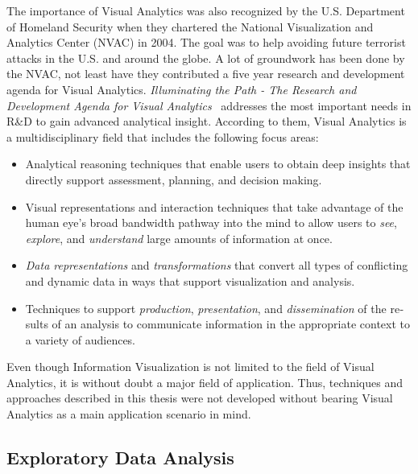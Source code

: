 \begin{english}
The importance of Visual Analytics was also recognized by the U.S. Department of Homeland Security when they chartered the National Visualization and Analytics Center (NVAC) in 2004. The goal was to help avoiding future terrorist attacks in the U.S. and around the globe. A lot of groundwork has been done by the NVAC, not least have they contributed a five year research and development agenda for Visual Analytics. \emph{Illuminating the Path - The Research and Development Agenda for Visual Analytics}~\cite{IlluminatingThePath05} addresses the most important needs in R\&D to gain advanced analytical insight. According to them, Visual Analytics is a multidisciplinary field that includes the following focus areas:

\begin{itemize}
\item Analytical reasoning techniques that enable users to obtain deep insights that directly support assessment, planning, and decision making.
\item Visual representations and interaction techniques that take advantage of the human eye's broad bandwidth pathway into the mind to allow users to \emph{see}, \emph{explore}, and \emph{understand} large amounts of information at once.
\item \emph{Data representations} and \emph{transformations} that convert all types of conflicting and dynamic data in ways that support visualization and analysis.
\item Techniques to support \emph{production}, \emph{presentation}, and \emph{dissemination} of the results of an analysis to communicate information in the appropriate context to a variety of audiences.
\end{itemize}

\SuperPar Even though Information Visualization is not limited to the field of Visual Analytics, it is without doubt a major field of application. Thus, techniques and approaches described in this thesis were not developed without bearing Visual Analytics as a main application scenario in mind.


\subsection{Exploratory Data Analysis}



\end{english}
